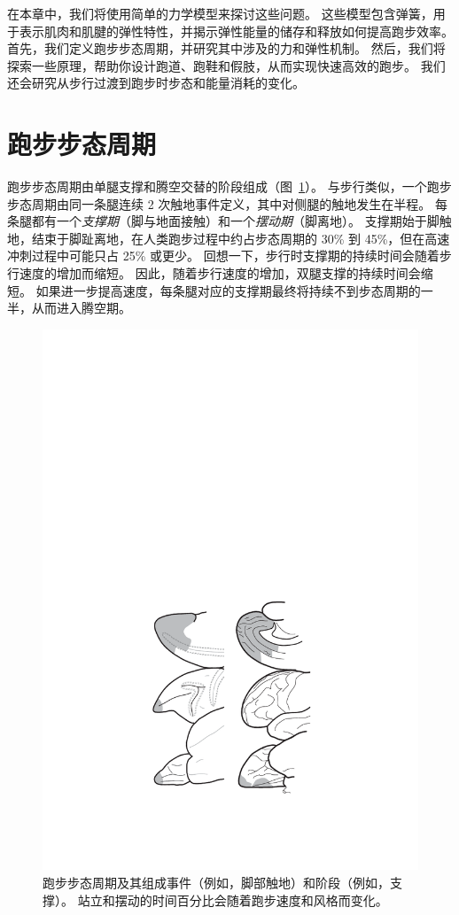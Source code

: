 在本章中，我们将使用简单的力学模型来探讨这些问题。
这些模型包含弹簧，用于表示肌肉和肌腱的弹性特性，并揭示弹性能量的储存和释放如何提高跑步效率。
首先，我们定义跑步步态周期，并研究其中涉及的力和弹性机制。
然后，我们将探索一些原理，帮助你设计跑道、跑鞋和假肢，从而实现快速高效的跑步。
我们还会研究从步行过渡到跑步时步态和能量消耗的变化。


\section{跑步步态周期}

跑步步态周期由单腿支撑和腾空交替的阶段组成（图~\ref{fig:3_1}）。
与步行类似，一个跑步步态周期由同一条腿连续 2 次触地事件定义，其中对侧腿的触地发生在半程。
每条腿都有一个\textit{支撑期}（脚与地面接触）和一个\textit{摆动期}（脚离地）。
支撑期始于脚触地，结束于脚趾离地，在人类跑步过程中约占步态周期的 30\% 到 45\%，但在高速冲刺过程中可能只占 25\% 或更少。
回想一下，步行时支撑期的持续时间会随着步行速度的增加而缩短。
因此，随着步行速度的增加，双腿支撑的持续时间会缩短。
如果进一步提高速度，每条腿对应的支撑期最终将持续不到步态周期的一半，从而进入腾空期。


\begin{figure}[!htb]
	\centering
	\includegraphics[width=1.0\linewidth]{chap3/3_1}
	\caption{跑步步态周期及其组成事件（例如，脚部触地）和阶段（例如，支撑）。
		站立和摆动的时间百分比会随着跑步速度和风格而变化。 \label{fig:3_1}}
\end{figure}

